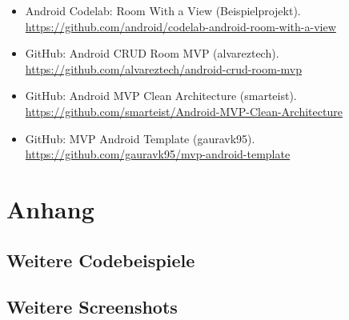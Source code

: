 \documentclass[14pt,a4paper]{report}
\begin{document}
\begin{itemize}
    \item Android Codelab: Room With a View (Beispielprojekt). \url{https://github.com/android/codelab-android-room-with-a-view}
    \item GitHub: Android CRUD Room MVP (alvareztech). \url{https://github.com/alvareztech/android-crud-room-mvp}
    \item GitHub: Android MVP Clean Architecture (smarteist). \url{https://github.com/smarteist/Android-MVP-Clean-Architecture}
    \item GitHub: MVP Android Template (gauravk95). \url{https://github.com/gauravk95/mvp-android-template}
\end{itemize}

\appendix
\chapter{Anhang}
\section{Weitere Codebeispiele}
% 

\section{Weitere Screenshots}
\end{document}
